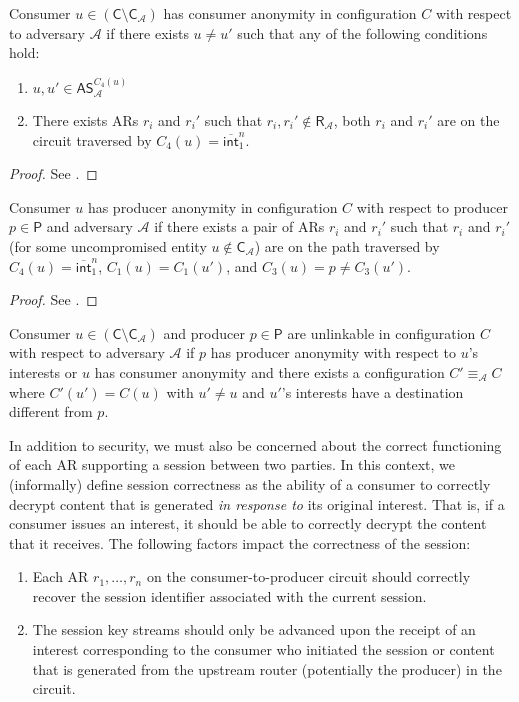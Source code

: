 \begin{thm}
Consumer $u \in (\mathsf{C} \setminus \mathsf{C}_{\mathcal{A}})$ has consumer anonymity in configuration $C$ with respect to adversary $\mathcal{A}$ if there exists $u \not= u'$ such that any of the following conditions hold:
\begin{enumerate}
	\item $u, u' \in \mathsf{AS}_{\mathcal{A}}^{C_4(u)}$
	\item There exists ARs $r_i$ and $r_i'$ such that $r_i,r_i' \notin \mathsf{R}_{\mathcal{A}}$, both $r_i$ and $r_i'$ are on the circuit traversed by $C_4(u) = \overline{\mathsf{int}}_1^n$.
\end{enumerate}
\end{thm}
\begin{proof}
See \cite{andana}.
\end{proof}

\begin{thm}
Consumer $u$ has producer anonymity in configuration $C$ with respect to producer $p \in \mathsf{P}$ and adversary $\mathcal{A}$ if there exists a pair of ARs $r_i$ and $r_i'$ such that $r_i$ and $r_i'$ (for some uncompromised entity $u \notin \mathsf{C}_{\mathcal{A}}$) are on the path traversed by $C_4(u) = \overline{\mathsf{int}}_1^n$, $C_1(u) = C_1(u')$, and $C_3(u) = p \not= C_3(u')$.
\end{thm}
\begin{proof}
See \cite{andana}.
\end{proof}

\begin{cor}
Consumer $u \in (\mathsf{C} \setminus \mathsf{C}_{\mathcal{A}})$ and producer $p \in \mathsf{P}$ are unlinkable in configuration $C$ with respect to adversary $\mathcal{A}$ if $p$ has producer anonymity with respect to $u$'s interests or $u$ has consumer anonymity and there exists a configuration $C' \equiv_{\mathcal{A}} C$ where $C'(u') = C(u)$ with $u' \not= u$ and $u'$'s interests have a destination different from $p$. 
\end{cor}

In addition to security, we must also be concerned about the correct functioning of each AR supporting a session between two parties. In this context, we (informally) define session correctness as the ability of a consumer to correctly decrypt content that is generated \emph{in response to} its original interest. That is, if a consumer issues an interest, it should be able to correctly decrypt the content that it receives. The following factors impact the correctness of the session:
\begin{enumerate}
  \item Each AR $r_1,\dots,r_n$ on the consumer-to-producer circuit should correctly recover the session identifier associated with the current session. 
  \item The session key streams should only be advanced upon the receipt of an interest corresponding to the consumer who initiated the session or content that is generated from the upstream router (potentially the producer) in the circuit.
\end{enumerate}

